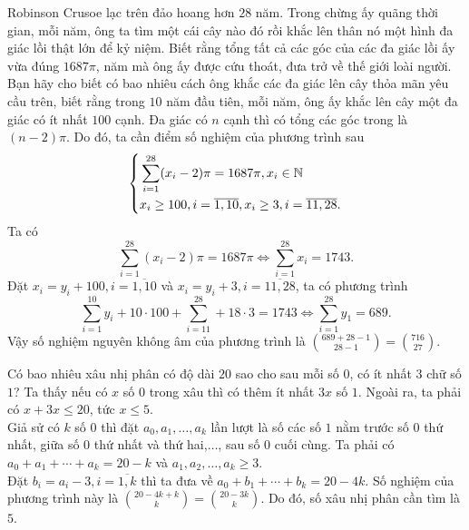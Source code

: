 \begin{bt}%
 Robinson Crusoe lạc trên đảo hoang hơn $28$ năm. Trong chừng ấy quãng thời gian, mỗi năm, ông ta tìm một cái cây nào đó rồi khắc lên thân nó một hình đa giác lồi thật lớn để kỷ niệm. Biết rằng tổng tất cả các góc của các đa giác lồi ấy vừa đúng $1687\pi$, năm mà ông ấy được cứu thoát, đưa trở về thế giới loài người. Bạn hãy cho biết có bao nhiêu cách ông khắc các đa giác lên cây thỏa mãn yêu cầu trên, biết rằng trong $10$ năm đầu tiên, mỗi năm, ông ấy khắc lên cây một đa giác có ít nhất $100$ cạnh.
 \loigiai
 {
 Đa giác có $n$ cạnh thì có tổng các góc trong là $(n-2)\pi$. Do đó, ta cần điểm số nghiệm của phương trình sau $$\left\{\begin{aligned}& \displaystyle\sum\limits_{i=1}^{28}(x_i-2)\pi=1687\pi, x_i\in \mathbb{N}\\& x_i\geq 100, i=\overline{1,10}, x_i\geq 3, i=\overline{11,28}.\end{aligned}\right.$$
 Ta có $$\displaystyle\sum\limits_{i=1}^{28}(x_i-2)\pi=1687\pi \Leftrightarrow \displaystyle\sum\limits_{i=1}^{28}x_i=1743.$$
 Đặt $x_i=y_i+100, i=\overline{1,10}$ và $x_i=y_i+3,i=\overline{11,28}$, ta có phương trình $$\displaystyle\sum\limits_{i=1}^{10}y_i+10\cdot 100+\displaystyle\sum\limits_{i=11}^{28}+18\cdot 3=1743 \Leftrightarrow \displaystyle\sum\limits_{i=1}^{28}y_1=689.$$
 Vậy số nghiệm nguyên không âm của phương trình là $\displaystyle {689+28-1\choose 28-1}={716\choose 27}$.
 }
\end{bt}

\begin{bt}%
Có bao nhiêu xâu nhị phân có độ dài $20$ sao cho sau mỗi số $0$, có ít nhất $3$ chữ số $1$? 
 \loigiai
 {Ta thấy nếu có $x$ số $0$ trong xâu thì có thêm ít nhất $3x$ số $1$. Ngoài ra, ta phải có $x+3x\le 20$, tức $x \le 5$.\\
			Giả sử có $k$ số $0$ thì đặt $a_0,a_1,\ldots,a_k$ lần lượt là số các số $1$ nằm trước số $0$ thứ nhất, giữa số $0$ thứ nhất và thứ hai,$\ldots$, sau số $0$ cuối cùng. Ta phải có $a_0+a_1+\cdots+a_k=20-k$ và $a_1,a_2,\ldots,a_k\ge 3$.\\
			Đặt $b_i=a_i-3,i = \overline {1,k}$ thì ta đưa về $a_0+b_1+\cdots+b_k=20-4k$. Số nghiệm của phương trình này là $\displaystyle {20-4k+k \choose k}={20-3k \choose k}$.
			Do đó, số xâu nhị phân cần tìm là $5$.}
\end{bt}


